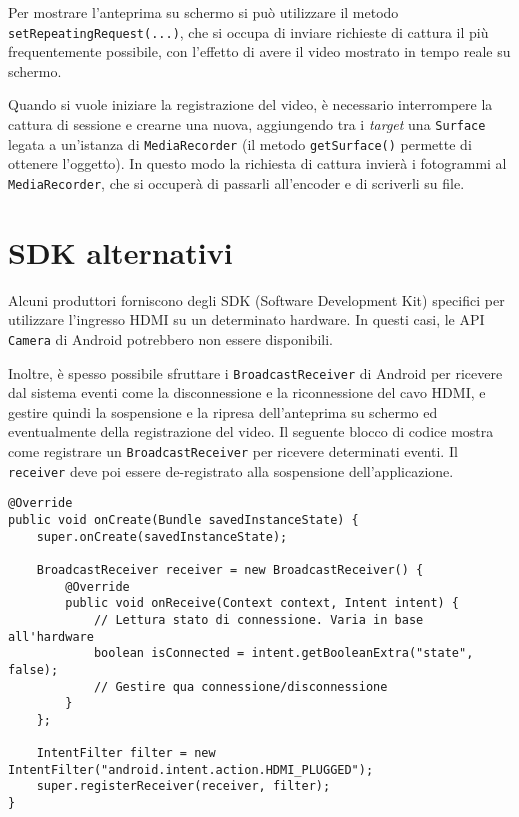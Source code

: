 Per mostrare l'anteprima su schermo si può utilizzare il metodo \texttt{setRepeatingRequest(...)}, che si occupa di inviare richieste di cattura il più frequentemente possibile, con l'effetto di avere il video mostrato in tempo reale su schermo.

Quando si vuole iniziare la registrazione del video, è necessario interrompere la cattura di sessione e crearne una nuova, aggiungendo tra i \emph{target} una \texttt{Surface} legata a un'istanza di \texttt{MediaRecorder} (il metodo \texttt{getSurface()} permette di ottenere l'oggetto). In questo modo la richiesta di cattura invierà i fotogrammi al \texttt{MediaRecorder}, che si occuperà di passarli all'encoder e di scriverli su file.

\section{SDK alternativi}
\label{sec:hdmi_sdk}

Alcuni produttori forniscono degli SDK (Software Development Kit) specifici per utilizzare l'ingresso HDMI su un determinato hardware. In questi casi, le API \texttt{Camera} di Android potrebbero non essere disponibili.

Inoltre, è spesso possibile sfruttare i \texttt{BroadcastReceiver} di Android per ricevere dal sistema eventi come la disconnessione e la riconnessione del cavo HDMI, e gestire quindi la sospensione e la ripresa dell'anteprima su schermo ed eventualmente della registrazione del video. Il seguente blocco di codice mostra come registrare un \texttt{BroadcastReceiver} per ricevere determinati eventi. Il \texttt{receiver} deve poi essere de-registrato alla sospensione dell'applicazione.


\begin{verbatim}
@Override
public void onCreate(Bundle savedInstanceState) {
    super.onCreate(savedInstanceState);

    BroadcastReceiver receiver = new BroadcastReceiver() {
        @Override
        public void onReceive(Context context, Intent intent) {
            // Lettura stato di connessione. Varia in base all'hardware
            boolean isConnected = intent.getBooleanExtra("state", false);
            // Gestire qua connessione/disconnessione
        }
    };
    
    IntentFilter filter = new IntentFilter("android.intent.action.HDMI_PLUGGED");
    super.registerReceiver(receiver, filter);
}
\end{verbatim}

